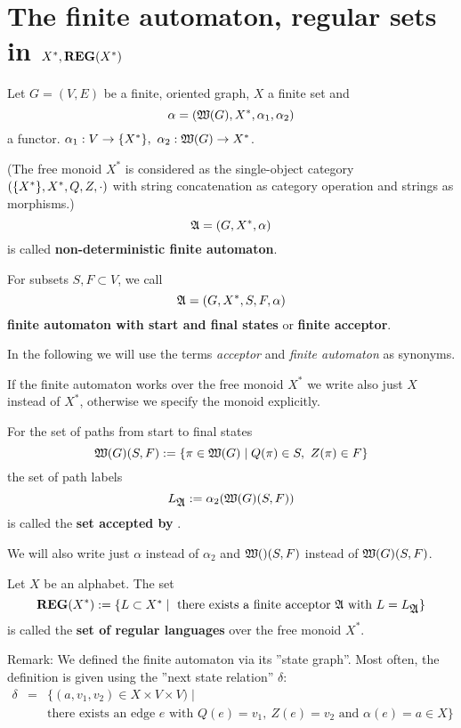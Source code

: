 \section{The finite automaton, regular sets in \texorpdfstring{$X^*,
\mbox{{\bf REG}}(X^*)$}{X*, REG(X*)}}

\begin{definition}
Let $G = (V, E)$ be a finite, oriented graph, $X$ a finite set and
\[\alpha = (\mbox{$\mathfrak{W}({G})$}, X^*,\alpha_1, \alpha_2)\]
a functor. $\alpha_1 : V \to \mbox{$\{X^*\}$},\ \alpha_2 : \mbox{$\mathfrak{W}({G})$} \to X^*$.

(The free monoid $X^*$ is considered as the single-object category
$(\mbox{$\{X^*\}$}, X^*, Q, Z, \cdot)$ with string concatenation as category
operation and strings as morphisms.)
\[ \mbox{$\mathfrak{A}$} = (G, X^*, \alpha) \]
is called {\bf non-deterministic finite automaton}.

For subsets $S, F \subset V$, we call 
\[ \mbox{$\mathfrak{A}$} = (G, X^*, S, F, \alpha) \]
{\bf finite automaton with start and final states} or {\bf finite acceptor}.
\end{definition}

In the following we will use the terms {\em acceptor} and {\em finite automaton}
as synonyms.

If the finite automaton works over the free monoid $X^*$ we write also just $X$
instead of $X^*$, otherwise we specify the monoid explicitly.

For the set of paths from start to final states 
\[ \mbox{$\mathfrak{W}({G})$}(S, F) := \mbox{$\{\pi \in \mbox{$\mathfrak{W}({G})$} \mid Q(\pi) \in S,\ Z(\pi)
\in F\}$} \]
the set of path labels
\[ L_{\mbox{$\mathfrak{A}$}} := \alpha_2(\mbox{$\mathfrak{W}({G})$}(S, F)) \]
is called the {\bf set accepted by} .

We will also write just $\alpha$ instead of $\alpha_2$ and $\mbox{$\mathfrak{W}({})$}(S,F)$
instead of $\mbox{$\mathfrak{W}({G})$}(S,F)$.

\begin{definition}
Let $X$ be an alphabet. The set
\[ \mbox{{\bf REG}}(X^*) := \mbox{$\{L \subset X^* \mid \mbox{ there exists a finite acceptor
}\mbox{$\mathfrak{A}$} \mbox{ with } L = L_{\mbox{$\mathfrak{A}$}}\}$} \]
is called the {\bf set of regular languages} over the free monoid $X^*$.
\end{definition}

Remark: We defined the finite automaton via its ''state graph''. Most
often, the definition is given using the ''next state relation'' $\delta$:
\begin{eqnarray*}
\delta &=& \{(a, v_1, v_2) \in X \times V \times V) \mid \\
&& \mbox{there exists an edge $e$ with $Q(e) = v_1,\ Z(e) = v_2$ and }
\alpha(e) = a \in X \}
\end{eqnarray*}

